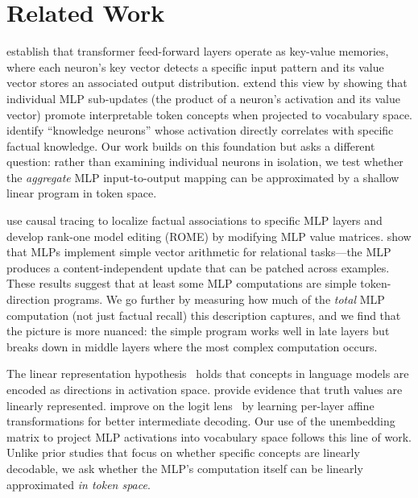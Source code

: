 \section{Related Work}
\label{sec:related}

\citet{geva2021transformer} establish that transformer feed-forward layers operate as key-value memories, where each neuron's key vector detects a specific input pattern and its value vector stores an associated output distribution.
\citet{geva2022transformer} extend this view by showing that individual MLP sub-updates (the product of a neuron's activation and its value vector) promote interpretable token concepts when projected to vocabulary space.
\citet{dai2022knowledge} identify ``knowledge neurons'' whose activation directly correlates with specific factual knowledge.
Our work builds on this foundation but asks a different question: rather than examining individual neurons in isolation, we test whether the \emph{aggregate} MLP input-to-output mapping can be approximated by a shallow linear program in token space.

\citet{meng2022locating} use causal tracing to localize factual associations to specific MLP layers and develop rank-one model editing (ROME) by modifying MLP value matrices.
\citet{merullo2023language} show that MLPs implement simple vector arithmetic for relational tasks---the MLP produces a content-independent update that can be patched across examples.
These results suggest that at least some MLP computations are simple token-direction programs.
We go further by measuring how much of the \emph{total} MLP computation (not just factual recall) this description captures, and we find that the picture is more nuanced: the simple program works well in late layers but breaks down in middle layers where the most complex computation occurs.

The linear representation hypothesis~\citep{park2024linear} holds that concepts in language models are encoded as directions in activation space.
\citet{marks2023geometry} provide evidence that truth values are linearly represented.
\citet{belrose2023eliciting} improve on the logit lens~\citep{nostalgebraist2020logit} by learning per-layer affine transformations for better intermediate decoding.
Our use of the unembedding matrix to project MLP activations into vocabulary space follows this line of work.
Unlike prior studies that focus on whether specific concepts are linearly decodable, we ask whether the MLP's computation itself can be linearly approximated \emph{in token space}.

